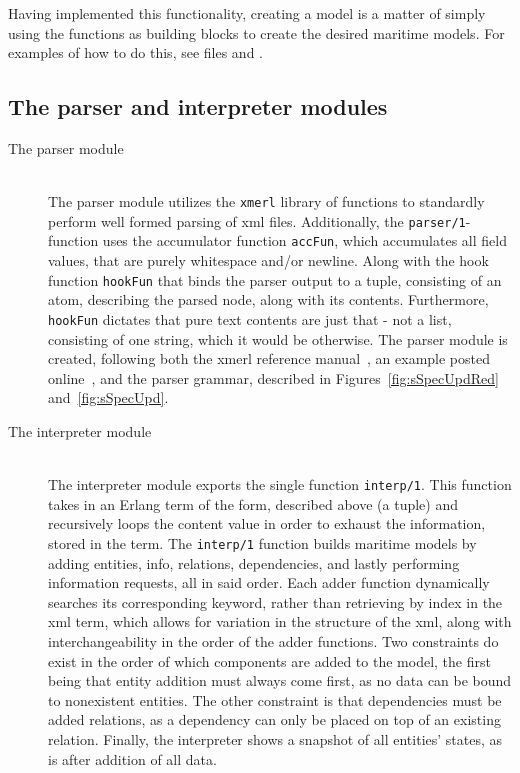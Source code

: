 Having implemented this functionality, creating a model is a matter of simply using the functions as building blocks to create the desired maritime models. For examples of how to do this, see files  and .

\subsection{The parser and interpreter modules}

\begin{description}
  \item[The parser module]\ \\
    The parser module utilizes the \lstinline{xmerl} library of functions to standardly perform well formed parsing of xml files. Additionally, the \lstinline{parser/1}-function uses the accumulator function \lstinline{accFun}, which accumulates all field values, that are  purely whitespace and/or newline. Along with the hook function \lstinline{hookFun} that binds the parser output to a tuple, consisting of an atom, describing the parsed node, along with its contents. Furthermore, \lstinline{hookFun} dictates that pure text contents are just that - not a list, consisting of one string, which it would be otherwise. The parser module is created, following both the xmerl reference manual~\cite{xmerl}, an example posted online~\cite{xmerlEx}, and the parser grammar, described in Figures~\ref{fig:sSpecUpdRed} and~\ref{fig:sSpecUpd}.
  \item[The interpreter module]\ \\
    The interpreter module exports the single function \lstinline{interp/1}. This function takes in an Erlang term of the form, described above (a tuple) and recursively loops the content value in order to exhaust the information, stored in the term. The \lstinline{interp/1} function builds maritime models by adding entities, info, relations, dependencies, and lastly performing information requests, all in said order. Each adder function dynamically searches its corresponding keyword, rather than retrieving by index in the xml term, which allows for variation in the structure of the xml, along with interchangeability in the order of the adder functions. Two constraints do exist in the order of which components are added to the model, the first being that entity addition must always come first, as no data can be bound to nonexistent entities. The other constraint is that dependencies must be added  relations, as a dependency can only be placed on top of an existing relation. Finally, the interpreter shows a snapshot of all entities' states, as is after addition of all data.
\end{description}
